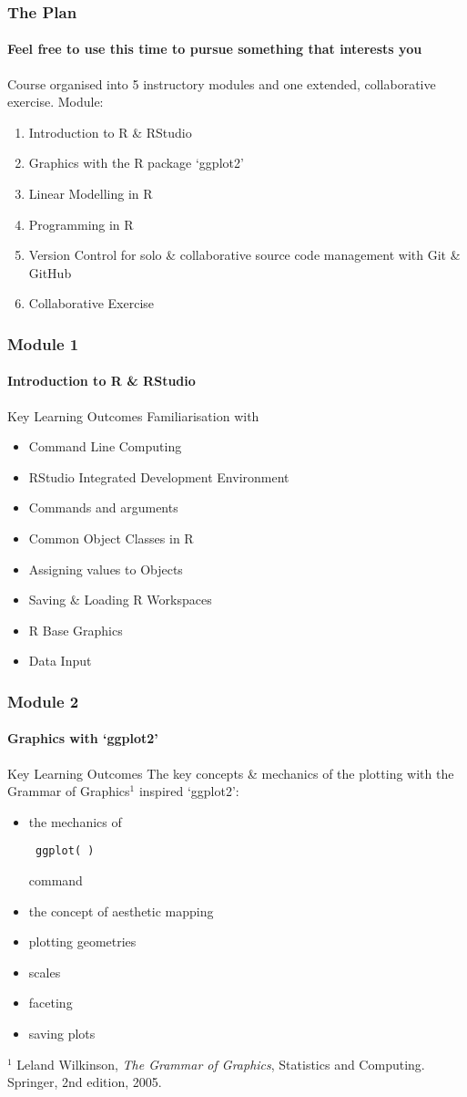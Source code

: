 \documentclass[xcolor=dvipsnames]{beamer}
\begin{document}
\begin{frame}
\frametitle{The Plan}
\framesubtitle{Feel free to use this time to pursue something that interests you}
Course organised into 5 instructory modules and one extended, collaborative exercise.
\newline
\newline
Module: \begin{enumerate}
\item Introduction to R \& RStudio  
\item Graphics with the R package `ggplot2'
\item Linear Modelling in R
\item Programming in R
\item Version Control for solo \& collaborative source code management with Git \& GitHub
\item Collaborative Exercise
\end{enumerate}

\end{frame}

\begin{frame}
\frametitle{Module 1}
\framesubtitle{Introduction to R \& RStudio}
\begin{block}{Key Learning Outcomes}
Familiarisation with \begin{itemize}
\item Command Line Computing
\item RStudio Integrated Development Environment
\item Commands and arguments
\item Common Object Classes in R
\item Assigning values to Objects
\item Saving \& Loading R Workspaces
\item R Base Graphics
\item Data Input
\end{itemize}
\end{block}
\end{frame}

\begin{frame}[fragile]
\frametitle{Module 2}
\framesubtitle{Graphics with `ggplot2'}
\begin{block}{Key Learning Outcomes}
The key concepts \& mechanics of the plotting with the Grammar of Graphics$^1$ inspired `ggplot2': \begin{itemize}
\item the mechanics of \begin{verbatim} ggplot( ) \end{verbatim} command
\item the concept of aesthetic mapping
\item plotting geometries
\item scales
\item faceting
\item saving plots
\end{itemize}
\end{block}

\tiny $^1$ Leland Wilkinson, \textit{The Grammar of Graphics}, Statistics and Computing. Springer, 2nd edition, 2005.
\end{frame}
\end{document}
